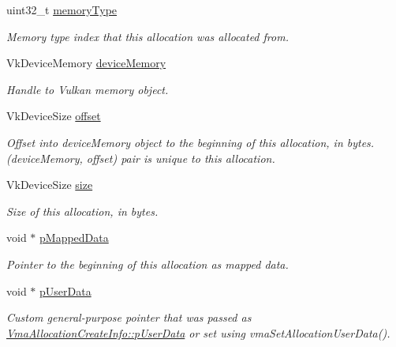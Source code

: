 \begin{DoxyCompactItemize}
\item 
uint32\+\_\+t \hyperlink{structVmaAllocationInfo_a7f6b0aa58c135e488e6b40a388dad9d5}{memory\+Type}
\begin{DoxyCompactList}\small\item\em Memory type index that this allocation was allocated from. \end{DoxyCompactList}\item 
Vk\+Device\+Memory \hyperlink{structVmaAllocationInfo_ae0bfb7dfdf79a76ffefc9a94677a2f67}{device\+Memory}
\begin{DoxyCompactList}\small\item\em Handle to Vulkan memory object. \end{DoxyCompactList}\item 
Vk\+Device\+Size \hyperlink{structVmaAllocationInfo_a4a3c732388dbdc7a23f9365b00825268}{offset}
\begin{DoxyCompactList}\small\item\em Offset into device\+Memory object to the beginning of this allocation, in bytes. (device\+Memory, offset) pair is unique to this allocation. \end{DoxyCompactList}\item 
Vk\+Device\+Size \hyperlink{structVmaAllocationInfo_aac76d113a6a5ccbb09fea00fb25fd18f}{size}
\begin{DoxyCompactList}\small\item\em Size of this allocation, in bytes. \end{DoxyCompactList}\item 
void $\ast$ \hyperlink{structVmaAllocationInfo_a5eeffbe2d2f30f53370ff14aefbadbe2}{p\+Mapped\+Data}
\begin{DoxyCompactList}\small\item\em Pointer to the beginning of this allocation as mapped data. \end{DoxyCompactList}\item 
void $\ast$ \hyperlink{structVmaAllocationInfo_adc507656149c04de7ed95d0042ba2a13}{p\+User\+Data}
\begin{DoxyCompactList}\small\item\em Custom general-\/purpose pointer that was passed as \hyperlink{structVmaAllocationCreateInfo_a8259e85c272683434f4abb4ddddffe19}{Vma\+Allocation\+Create\+Info\+::p\+User\+Data} or set using vma\+Set\+Allocation\+User\+Data(). \end{DoxyCompactList}\end{DoxyCompactItemize}


